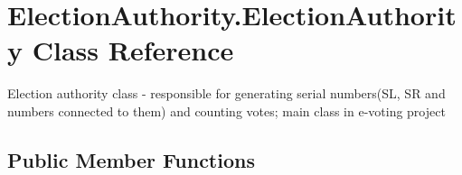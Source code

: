 \hypertarget{class_election_authority_1_1_election_authority}{}\section{Election\+Authority.\+Election\+Authority Class Reference}
\label{class_election_authority_1_1_election_authority}


Election authority class -\/ responsible for generating serial numbers(\+S\+L, S\+R and numbers connected to them) and counting votes; main class in e-\/voting project  


\subsection*{Public Member Functions}

